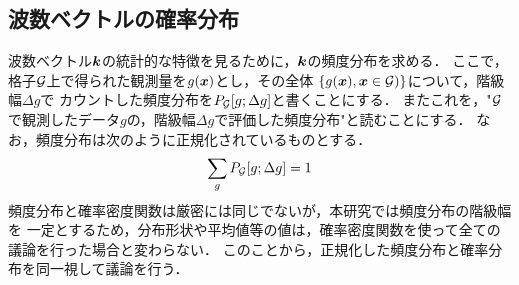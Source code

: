 \subsection{波数ベクトルの確率分布}
波数ベクトル$\mbox{\boldmath{$k$}}$の統計的な特徴を見るために，$\mbox{\boldmath{$k$}}$の頻度分布を求める．
ここで，格子$\cal G$上で得られた観測量を$g(\mbox{\boldmath{$x$}})$とし，その全体
$\left\{ g(\fat{x}), \fat{x}\in {\cal G}) \right\}$について，階級幅$\Delta g$で
カウントした頻度分布を$P_{\cal G} [g;\Delta g]$と書くことにする．
またこれを，"${\cal G}$で観測したデータ$g$の，階級幅$\Delta g$で評価した頻度分布"と読むことにする．
なお，頻度分布は次のように正規化されているものとする．
\begin{equation}
	\sum_{g} P_{\cal G}[g;\Delta g]=1
	\label{eqn:normalize}
\end{equation}
頻度分布と確率密度関数は厳密には同じでないが，本研究では頻度分布の階級幅を
一定とするため，分布形状や平均値等の値は，確率密度関数を使って全ての議論を行った場合と変わらない．
このことから，正規化した頻度分布と確率分布を同一視して議論を行う．
